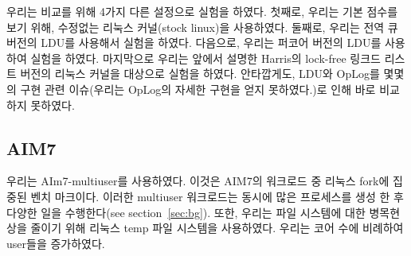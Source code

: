 우리는 비교를 위해 4가지 다른 설정으로 실험을 하였다. 
첫째로, 우리는 기본 점수를 보기 위해, 수정없는 리눅스 커널(stock linux)을 사용하였다.
둘째로, 우리는 전역 큐 버전의 LDU를 사용해서 실험을 하였다.  
다음으로, 우리는 퍼코어 버전의 LDU를 사용하여 실험을 하였다. 
마지막으로 우리는 앞에서 설명한 Harris의 lock-free 링크드 리스트 버전의 리눅스 커널을 대상으로 
실험을 하였다.  
안타깝게도, LDU와 OpLog를 몇몇의 구현 관련 이슈(우리는 OpLog의 자세한 구현을 얻지 못하였다.)로
 인해 바로 비교하지 못하였다.

\subsection{AIM7}



우리는 AIm7-multiuser를 사용하였다. 이것은 AIM7의 워크로드 중 리눅스 fork에 집중된 벤치 마크이다. 
이러한 multiuser 워크로드는 동시에 많은 프로세스를 생성 한 후 다양한
 일을 수행한다(see section~\ref{sec:bg}).
 또한, 우리는 파일 시스템에 대한 병목현상을 줄이기 위해 리눅스 temp 파일 시스템을 사용하였다. 
우리는 코어 수에 비례하여 user들을 증가하였다. 
 
